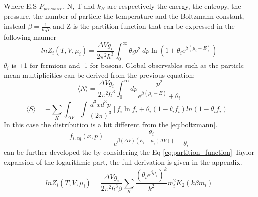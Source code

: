 \documentclass[12pt,a4paper]{book}
\begin{document}
	
	Where E,S $P_{pressure}$, N, T and $k_B$ are respectively the energy, the entropy, the pressure, the number of particle the temperature and the Boltzmann constant, instead $\beta=\frac{1}{k_BT}$ and Z is the partition function that can be expressed in the following manner
	\begin{equation}
		ln Z_i(T,V,\mu_i)= \frac{\Delta V g_i}{2\pi^2\hbar^3} \int_{0}^{\infty} \theta_i p^2 \  dp \ln(1+\theta_i e^{\beta(\mu_i-E)})
		\label{eq:partition_function}
	\end{equation}
	$\theta_i$ is +1 for fermions and -1 for bosons. Global observables such as the
	particle mean multiplicities can be derived from the previous equation:
	\begin{equation}
		\langle N \rangle = \frac{\Delta V g_i}{2\pi^2\hbar^3} \int_{0}^{\infty} dp \frac{p^2}{e^{\beta(\mu_i-E)}+\theta_i} 
		\label{eq:mean_particle_number}
	\end{equation}
	\begin{equation}
		\langle S \rangle= -\sum_{K} \int_{\Delta V} \int \frac{d^3x d^3p}{(2\pi)^3} \left[f_i \ln f_i + \theta_i (1-\theta_if_i)ln(1-\theta_if_i) \right]
		\label{eq:entropy}
	\end{equation}
	In this case the distribution is a bit different from the \ref{eq:boltzmann}.
	\begin{equation}
		f_{i,eq}(x,p)=\frac{g_i}{e^{\beta(\Delta V)(E_i-\mu_i(\Delta V))} +\theta_i} 
		\label{eq:boltmann2}
	\end{equation}
	can be further developed the by considering the Eq \ref{eq:partition_function} Taylor expansion of the logarithmic part, the full derivation is given in the appendix.
	\begin{equation}
		ln Z_i(T,V,\mu_i)= \frac{\Delta V g_i}{2\pi^2\hbar^3\beta} \sum_{K} \frac{(\theta_i e^{\beta \mu_i})^k}{k^2} m_i^2K_2(k\beta m_i)
		\label{eq:partition_function2}
	\end{equation}
	
\end{document}
